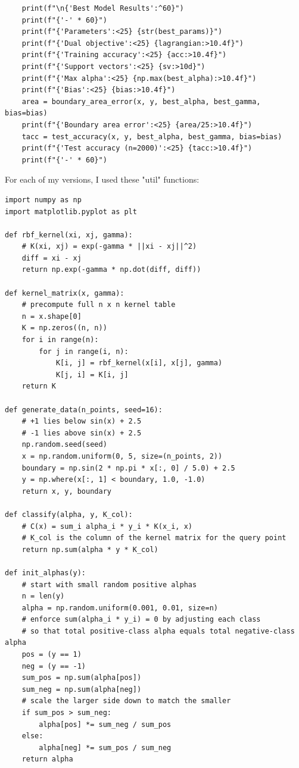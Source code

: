 \documentclass[11pt]{article}
\theoremstyle{mystyle}
\begin{document}
\begin{verbatim}
    print(f"\n{'Best Model Results':^60}")
    print(f"{'-' * 60}")
    print(f"{'Parameters':<25} {str(best_params)}")
    print(f"{'Dual objective':<25} {lagrangian:>10.4f}")
    print(f"{'Training accuracy':<25} {acc:>10.4f}")
    print(f"{'Support vectors':<25} {sv:>10d}")
    print(f"{'Max alpha':<25} {np.max(best_alpha):>10.4f}")
    print(f"{'Bias':<25} {bias:>10.4f}")
    area = boundary_area_error(x, y, best_alpha, best_gamma, bias=bias)
    print(f"{'Boundary area error':<25} {area/25:>10.4f}")
    tacc = test_accuracy(x, y, best_alpha, best_gamma, bias=bias)
    print(f"{'Test accuracy (n=2000)':<25} {tacc:>10.4f}")
    print(f"{'-' * 60}")
 \end{verbatim}
For each of my versions, I used these "util" functions:
 \begin{verbatim}
import numpy as np
import matplotlib.pyplot as plt

def rbf_kernel(xi, xj, gamma):
    # K(xi, xj) = exp(-gamma * ||xi - xj||^2)
    diff = xi - xj
    return np.exp(-gamma * np.dot(diff, diff))

def kernel_matrix(x, gamma):
    # precompute full n x n kernel table
    n = x.shape[0]
    K = np.zeros((n, n))
    for i in range(n):
        for j in range(i, n):
            K[i, j] = rbf_kernel(x[i], x[j], gamma)
            K[j, i] = K[i, j]
    return K

def generate_data(n_points, seed=16):
    # +1 lies below sin(x) + 2.5
    # -1 lies above sin(x) + 2.5
    np.random.seed(seed)
    x = np.random.uniform(0, 5, size=(n_points, 2))
    boundary = np.sin(2 * np.pi * x[:, 0] / 5.0) + 2.5
    y = np.where(x[:, 1] < boundary, 1.0, -1.0)
    return x, y, boundary

def classify(alpha, y, K_col):
    # C(x) = sum_i alpha_i * y_i * K(x_i, x)
    # K_col is the column of the kernel matrix for the query point
    return np.sum(alpha * y * K_col)

def init_alphas(y):
    # start with small random positive alphas
    n = len(y)
    alpha = np.random.uniform(0.001, 0.01, size=n)
    # enforce sum(alpha_i * y_i) = 0 by adjusting each class
    # so that total positive-class alpha equals total negative-class alpha
    pos = (y == 1)
    neg = (y == -1)
    sum_pos = np.sum(alpha[pos])
    sum_neg = np.sum(alpha[neg])
    # scale the larger side down to match the smaller
    if sum_pos > sum_neg:
        alpha[pos] *= sum_neg / sum_pos
    else:
        alpha[neg] *= sum_pos / sum_neg
    return alpha



\end{verbatim}
\end{document}
